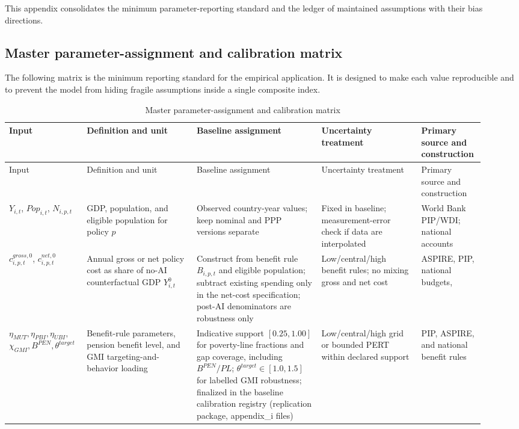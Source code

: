 \documentclass[11pt,a4paper]{article}
\begin{document}
This appendix consolidates the minimum parameter-reporting standard and the ledger of maintained assumptions with their bias directions.

\subsection{Master parameter-assignment and calibration matrix}

The following matrix is the minimum reporting standard for the empirical application. It is designed to make each value reproducible and to prevent the model from hiding fragile assumptions inside a single composite index.

\begin{landscape}
\begingroup
\scriptsize
\singlespacing
\setlength{\tabcolsep}{3pt}
\begin{longtable}{@{}p{0.14\linewidth}p{0.22\linewidth}p{0.25\linewidth}p{0.20\linewidth}p{0.11\linewidth}@{}}
\caption{Master parameter-assignment and calibration matrix}\label{tab:master_calibration_matrix}\\
\toprule
Input & Definition and unit & Baseline assignment & Uncertainty treatment & Primary source and construction \\
\midrule
\endfirsthead
\toprule
Input & Definition and unit & Baseline assignment & Uncertainty treatment & Primary source and construction \\
\midrule
\endhead
$Y_{i,t}$, $Pop_{i,t}$, $N_{i,p,t}$ & GDP, population, and eligible population for policy $p$ & Observed country-year values; keep nominal and PPP versions separate & Fixed in baseline; measurement-error check if data are interpolated & World Bank PIP/WDI; national accounts \\
$c^{gross,0}_{i,p,t}$, $c^{net,0}_{i,p,t}$ & Annual gross or net policy cost as share of no-AI counterfactual GDP $Y^0_{i,t}$ & Construct from benefit rule $B_{i,p,t}$ and eligible population; subtract existing spending only in the net-cost specification; post-AI denominators are robustness only & Low/central/high benefit rules; no mixing gross and net cost & ASPIRE, PIP, national budgets, \citet{gentilini2020ubi} \\
$\eta_{MUT},\eta_{PBI},\eta_{UBI},$\newline $\chi_{GMI},B^{PEN},\theta^{target}$ & Benefit-rule parameters, pension benefit level, and GMI targeting-and-behavior loading & Indicative support $[0.25,1.00]$ for poverty-line fractions and gap coverage, including $B^{PEN}/PL$; $\theta^{target}\in[1.0,1.5]$ for labelled GMI robustness; finalized in the baseline calibration registry (replication package, appendix\_i files) & Low/central/high grid or bounded PERT within declared support & PIP, ASPIRE, and national benefit rules \\

\end{longtable}
\end{landscape}
\end{document}
